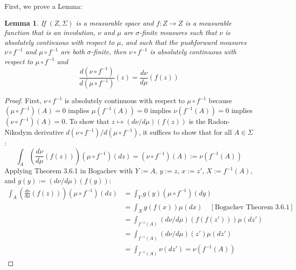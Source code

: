 \documentclass[twoside]{article}
\newtheorem{lemma}[theorem]{Lemma}
\begin{document}
First, we prove a Lemma:
\begin{lemma} \label{lemma:reference-measure-pushforward}
If $(Z, \Sigma)$ is a measurable space and $f : Z \to Z$ is a measurable function that is an involution, $\nu$ and $\mu$ are $\sigma$-finite measures such that $\nu$ is absolutely continuous with respect to $\mu$, and such that the pushforward measures $\nu \circ f^{-1}$ and $\mu \circ f^{-1}$ are both $\sigma$-finite, then
$\nu \circ f^{-1}$ is absolutely continuous with respect to $\mu \circ f^{-1}$ and
\begin{equation}
\frac{d (\nu \circ f^{-1})}{d (\mu \circ f^{-1})}(z) = \frac{d \nu}{d \mu}(f(z))
\end{equation}
\end{lemma}
\begin{proof}
First, $\nu \circ f^{-1}$ is absolutely continuous with respect to $\mu \circ f^{-1}$ because
$(\mu \circ f^{-1})(A) = 0$ implies $\mu(f^{-1}(A)) = 0$ implies $\nu(f^{-1}(A)) = 0$ implies $(\nu \circ f^{-1})(A) = 0$.
To show that $z \mapsto (d \nu / d \mu)(f(z))$ is the Radon-Nikodym derivative $d (\nu \circ f^{-1}) / d (\mu \circ f^{-1})$, it suffices to show that for all $A \in \Sigma$:
\begin{equation}
\int_A \left( \frac{d \nu}{d \mu} (f(z)) \right) ( \mu \circ f^{-1} )(dz) = (\nu \circ f^{-1})(A) := \nu(f^{-1}(A))
\end{equation}
Applying Theorem 3.6.1 in Bogachev with $Y := A$, $y := z$, $x := z'$, $X := f^{-1}(A)$, and $g(y) := (d\nu / d\mu)(f(y))$:
\begin{align}
\int_A \left( \frac{d \nu}{d \mu} (f(z)) \right) ( \mu \circ f^{-1} )(dz)
&= \int_Y g(y) ( \mu \circ f^{-1} )(dy)\\
&= \int_X g(f(x)) \mu(dx) \;\;\;\; [\mbox{Bogachev Theorem 3.6.1}]\\
&= \int_{f^{-1}(A)} (d\nu / d\mu)(f(f(z'))) \mu(dz')\\
&= \int_{f^{-1}(A)} (d\nu / d\mu)(z') \mu(dz')\\
&= \int_{f^{-1}(A)} \nu(dz')
= \nu(f^{-1}(A))
\end{align}

\end{proof}
\end{document}
